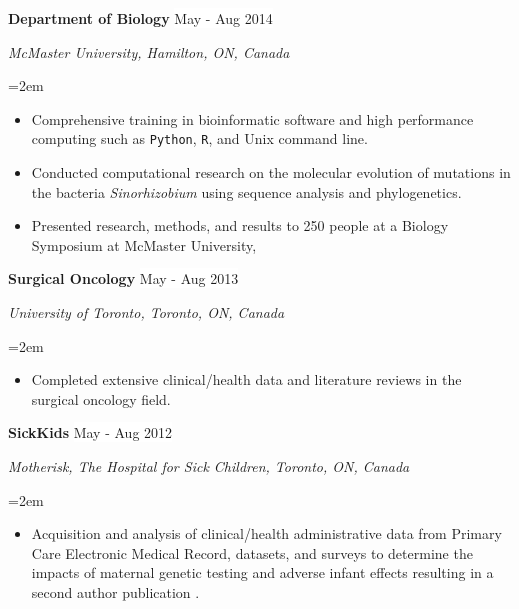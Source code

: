 \documentclass[paper=a4,fontsize=11pt]{scrartcl}	 			%
\newcommand{\NewPart}[1]{\section*{\uppercase{#1}}}
\newcommand{\EducationEntry}[4]{
		\noindent \textbf{#1} \hfill 					%
		\colorbox{White}{%
			\parbox{10em}{%
			\hfill\color{Black}#2}} \par				%
		\noindent \textit{#3} \par					%
		\noindent\hangindent=2em\hangafter=0 \small #4 	%
		\normalsize \par}
\newcommand{\WorkEntry}[4]{						%
		\noindent \textbf{#1} \hfill 					%
		\colorbox{White}{\color{Black}#2} \par		%
		\noindent \textit{#3} \par					%
		\noindent\hangindent=2em\hangafter=0 \small #4 	%
		\normalsize \par}
\newcommand{\WorkEntryF}[2]{						%
	 \textbf{#1} \hfill 					%
	\colorbox{White}{\color{Black}#2} \par}
\begin{document}
	\WorkEntry{Department of Biology}{May - Aug 2014}{McMaster University, Hamilton, ON, Canada}{
		\begin{itemize}
		\item Comprehensive training in bioinformatic software and high performance computing such as \texttt{Python}, \texttt{R}, and Unix command line. 
		\item Conducted computational research on the molecular evolution of mutations in the bacteria \textit{Sinorhizobium} using sequence analysis and phylogenetics.
		\item Presented research, methods, and results to 250 people at a Biology Symposium at McMaster University, 
		\end{itemize}}
	\WorkEntry{Surgical Oncology}{May - Aug 2013}{University of Toronto, Toronto, ON, Canada}{
		\begin{itemize}
			\setlength{\itemindent}{0.2in}
		\item Completed extensive clinical/health data and literature reviews in the surgical oncology field.
		\end{itemize}}
	\sloppy\WorkEntry{SickKids}{May - Aug 2012}{Motherisk, The Hospital for Sick Children, Toronto, ON, Canada}{
		\begin{itemize}
				\setlength{\itemindent}{0.2in}
		\item Acquisition and analysis of clinical/health administrative data from Primary Care Electronic Medical Record, datasets, and surveys to determine the impacts of maternal genetic testing and adverse infant effects resulting in a second author publication \cite{More:17}.
		\end{itemize}}

%
\end{document}
